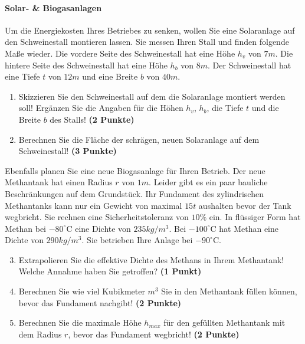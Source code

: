 \documentclass[a4paper, 10pt]{scrartcl}\usepackage[]{graphicx}\usepackage[]{xcolor}
\begin{document}
\paragraph{Solar- \& Biogasanlagen}



Um die Energiekosten Ihres Betriebes zu senken, wollen Sie eine Solaranlage
auf den Schweinestall montieren lassen. Sie messen Ihren Stall und finden
folgende Ma{\ss}e wieder. Die vordere Seite des Schweinestall hat eine H{\"o}he
$h_v$ von $7m$. Die hintere Seite des Schweinestall hat eine
H{\"o}he $h_b$ von $8m$. Der Schweinestall hat eine Tiefe $t$ von
$12m$ und eine Breite $b$ von $40m$.

\begin{enumerate}
\item Skizzieren Sie den Schweinestall auf dem die Solaranlage montiert
  werden soll! Erg{\"a}nzen Sie die Angaben f{\"u}r die H{\"o}hen $h_v$, $h_b$, die
  Tiefe $t$ und die Breite $b$ des Stalls!  \textbf{(2 Punkte)}
\item Berechnen Sie die Fl{\"a}che der schr{\"a}gen, neuen Solaranlage auf dem
  Schweinestall! \textbf{(3 Punkte)}
\end{enumerate}

Ebenfalls planen Sie eine neue Biogasanlage f{\"u}r Ihren Betrieb. Der neue
Methantank hat einen Radius $r$ von $1m$. Leider gibt es ein
paar bauliche Beschr{\"a}nkungen auf dem Grundst{\"u}ck. Ihr Fundament des
zylindrischen Methantanks kann nur ein Gewicht von maximal
$15t$ aushalten bevor der Tank wegbricht. Sie rechnen eine
Sicherheitstoleranz von $10\%$ ein. In fl{\"u}ssiger Form hat
Methan bei $-80^\circ\text{C}$ eine Dichte von
$235kg/m^3$. Bei $-100^\circ\text{C}$ hat Methan eine Dichte
von $290kg/m^3$. Sie betrieben Ihre Anlage bei
$-90^\circ\text{C}$.

\begin{enumerate}
  \setcounter{enumi}{2}
\item Extrapolieren Sie die effektive Dichte des Methans in Ihrem
  Methantank! Welche Annahme haben Sie getroffen? \textbf{(1 Punkt)}
\item Berechnen Sie wie viel Kubikmeter $m^3$ Sie in den Methantank f{\"u}llen
  k{\"o}nnen, bevor das Fundament nachgibt! \textbf{(2 Punkte)}
\item Berechnen Sie die maximale H{\"o}he $h_{max}$ f{\"u}r den gef{\"u}llten
  Methantank mit dem Radius $r$, bevor das Fundament wegbricht! \textbf{(2
    Punkte)}
\end{enumerate}
\end{document}
